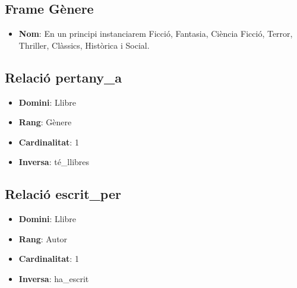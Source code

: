 \subsection{Frame Gènere}

\begin{itemize}
\item \textbf{Nom}: En un principi instanciarem Ficció, Fantasia, Ciència Ficció, Terror, Thriller, Clàssics, Històrica i Social.
\end{itemize}

\subsection{Relació pertany\_a}
\begin{itemize}
  \item \textbf{Domini}: Llibre
  \item \textbf{Rang}: Gènere
  \item \textbf{Cardinalitat}: 1   
  \item \textbf{Inversa}: té\_llibres
\end{itemize}


\subsection{Relació escrit\_per}
\begin{itemize}
  \item \textbf{Domini}: Llibre
  \item \textbf{Rang}: Autor
  \item \textbf{Cardinalitat}: 1   
  \item \textbf{Inversa}: ha\_escrit
\end{itemize}

